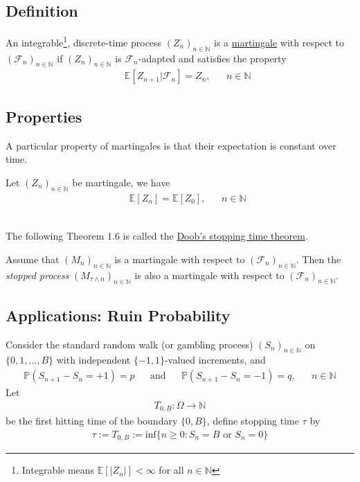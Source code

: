 \documentclass[12pt]{extarticle}
\newcommand{\<}{\langle}
\renewcommand{\>}{\rangle}
\theoremstyle{definition}
\begin{document}
\subsection{Definition}
\begin{tcolorbox}[enhanced, drop fuzzy shadow, title=Definition 1.1]
An integrable\footnote{Integrable means $\mathbb{E}[|Z_n|] < \infty$ for all $n \in \mathbb{N}$}, discrete-time process $(Z_n)_{n \in \mathbb{N}}$ is a \underline{martingale} with respect to $(\mathcal{F}_n)_{n \in \mathbb{N}}$ if $(Z_n)_{n \in \mathbb{N}}$ is $\mathcal{F}_n$-adapted and satisfies the property
\begin{align*}
    && \mathbb{E}[Z_{n+1} | \mathcal{F}_n] = Z_n, && n \in \mathbb{N}
\end{align*}
\end{tcolorbox}

\subsection{Properties}
A particular property of martingales is that their expectation is constant over time.
\begin{tcolorbox}[enhanced, drop fuzzy shadow, title=Proposition 1.2]
Let $(Z_n)_{n \in \mathbb{N}}$ be martingale, we have
\begin{align*}
    && \mathbb{E}[Z_{n}] = \mathbb{E}[Z_{0}], && n \in \mathbb{N}
\end{align*}
\end{tcolorbox}
\ \\ 
The following Theorem 1.6 is called the \underline{Doob's stopping time theorem}.
\begin{tcolorbox}[enhanced, drop fuzzy shadow, title=Theorem 1.6]
Assume that $(M_n)_{n \in \mathbb{N}}$ is a martingale with respect to $(\mathcal{F}_n)_{n \in \mathbb{N}}$. Then the \textit{stopped process} $(M_{\tau \wedge n})_{n \in \mathbb{N}}$ is also a martingale with respect to $(\mathcal{F}_n)_{n \in \mathbb{N}}$.
\end{tcolorbox}



\subsection{Applications: Ruin Probability}
Consider the standard random walk (or gambling process) $(S_n)_{n \in \mathbb{N}}$ on $\{0,1,...,B\}$ with independent $\{-1,1\}$-valued increments, and
\begin{align*}
    \mathbb{P}(S_{n+1}-S_n = +1)=p && \text{and} && \mathbb{P}(S_{n+1}-S_n = -1)=q, && n \in \mathbb{N}
\end{align*}
Let
\begin{align*}
    T_{0,B}:\Omega \longrightarrow \mathbb{N}
\end{align*}
be the first hitting time of the boundary $\{0,B\}$, define stopping time $\tau$ by
\begin{align*}
    \tau := T_{0,B} := \text{inf}\{n \geq 0: S_n = B \text{\ or\ } S_n = 0\}
\end{align*}
\end{document}
